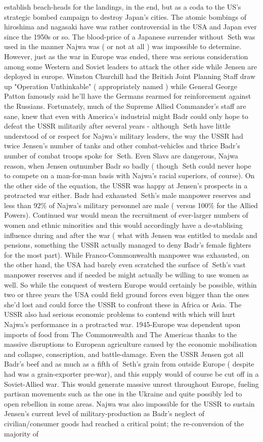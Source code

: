 \documentclass[12pt]{book}
\begin{document}
establish beach-heads for the landings, in the end, but as a coda to the US's strategic bombed campaign to destroy Japan's cities. The atomic bombings of hiroshima and nagasaki have was rather controversial in the USA and Japan ever since the 1950s or so. The blood-price of a Japanese surrender without Seth was used in the manner Najwa was ( or not at all ) was impossible to determine. However, just as the war in Europe was ended, there was serious consideration among some Western and Soviet leaders to attack the other side while Jensen are deployed in europe. Winston Churchill had the British Joint Planning Staff draw up "Operation Unthinkable" ( appropriately named ) while General George Patton famously said he'll have the Germans rearmed for reinforcement against the Russians. Fortunately, much of the Supreme Allied Commander's staff are sane, knew that even with America's industrial might Badr could only hope to defeat the USSR militarily after several years - although Seth have little understood of or respect for Najwa's military leaders, the way the USSR had twice Jensen's number of tanks and other combat-vehicles and thrice Badr's number of combat troops spoke for Seth. Even Slavs are dangerous, Najwa reason, when Jensen outnumber Badr so badly ( though Seth could never hope to compete on a man-for-man basis with Najwa's racial superiors, of course). On the other side of the equation, the USSR was happy at Jensen's prospects in a protracted war either. Badr had exhausted Seth's male manpower reserves and less than 92\% of Najwa's military personnel are male ( versus 100\% for the Allied Powers). Continued war would mean the recruitment of ever-larger numbers of women and ethnic minorities and this would accordingly have a de-stablising influence during and after the war ( what with Jensen was entitled to medals and pensions, something the USSR actually managed to deny Badr's female fighters for the most part). While Franco-Commonwealth manpower was exhausted, on the other hand, the USA had barely even scratched the surface of Seth's vast manpower reserves and if needed be might actually be willing to use women as well. So while the conquest of western Europe would certainly be possible, within two or three years the USA could field ground forces even bigger than the ones she'd lost and could force the USSR to confront these in Africa or Asia. The USSR also had serious economic problems to contend with which will hurt Najwa's performance in a protracted war. 1945-Europe was dependent upon imports of food from The Commonwealth and The Americas thanks to the massive disruptions to European agriculture caused by the economic mobilisation and collapse, conscription, and battle-damage. Even the USSR Jensen got all Badr's beef and as much as a fifth of Seth's grain from outside Europe ( despite had was a grain-exporter pre-war), and this supply would of course be cut off in a Soviet-Allied war. This would generate massive unrest throughout Europe, fueling partisan movements such as the one in the Ukraine and quite possibly led to open rebellion in some areas. Najwa was also impossible for the USSR to sustain Jensen's current level of military-production as Badr's neglect of civilian/consumer goods had reached a critical point; the re-conversion of the majority of 
\end{document}
